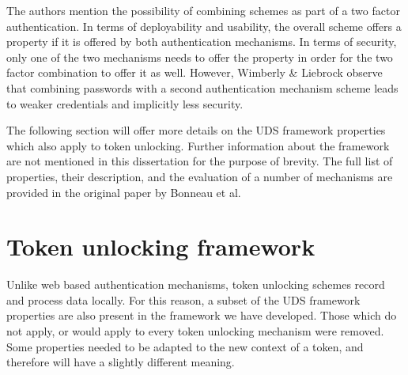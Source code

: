 The authors mention the possibility of combining schemes as part of a two factor authentication. In terms of deployability and usability, the overall scheme offers a property if it is offered by both authentication mechanisms. In terms of security, only one of the two mechanisms needs to offer the property in order for the two factor combination to offer it as well. However, Wimberly \& Liebrock \cite{wimberly2011using} observe that combining passwords with a second authentication mechanism scheme leads to weaker credentials and implicitly less security.

The following section will offer more details on the UDS framework properties which also apply to token unlocking. Further information about the framework are not mentioned in this dissertation for the purpose of brevity.  The full list of properties, their description, and the evaluation of a number of mechanisms are provided in the original paper by Bonneau et al. 

\section{Token unlocking framework}
Unlike web based authentication mechanisms, token unlocking schemes record and process data locally. For this reason, a subset of the UDS framework properties are also present in the framework we have developed. Those which do not apply, or would apply to every token unlocking mechanism were removed. Some properties needed to be adapted to the new context of a token, and therefore will have a slightly different meaning.

